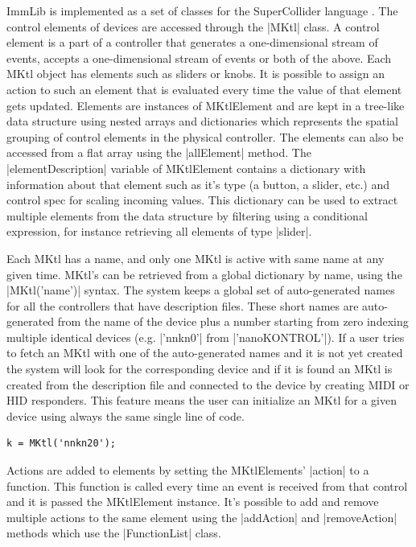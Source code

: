 \documentclass{article}
\begin{document}
ImmLib is implemented as a set of classes for the SuperCollider language \cite{mccartney_ret}. The control elements of devices are accessed through the |MKtl| class. A control element is a part of a controller that generates a one-dimensional stream of events, accepts a one-dimensional stream of events or both of the above. Each MKtl object has elements such as sliders or knobs. It is possible to assign an action to such an element that is evaluated every time the value of that element gets updated. Elements are instances of MKtlElement and are kept in a tree-like data structure using nested arrays and dictionaries which represents the spatial grouping of control elements in the physical controller. The elements can also be accessed from a flat array using the |allElement| method. The |elementDescription| variable of MKtlElement contains a dictionary with information about that element such as it's type (a button, a slider, etc.) and control spec for scaling incoming values. This dictionary can be used to extract multiple elements from the data structure by filtering using a conditional expression, for instance retrieving all elements of type |slider|.

Each MKtl has a name, and only one MKtl is active with same name at any given time. MKtl's can be retrieved from a global dictionary by name, using the |MKtl('name')| syntax. The system keeps a global set of auto-generated names for all the controllers that have description files. These short names are auto-generated from the name of the device plus a number starting from zero indexing multiple identical devices (e.g. |'nnkn0'| from |'nanoKONTROL'|). If a user tries to fetch an MKtl with one of the auto-generated names and it is not yet created the system will look for the corresponding device and if it is found an MKtl is created from the description file and connected to the device by creating MIDI or HID responders. This feature means the user can initialize an MKtl for a given device using always the same single line of code.

\begin{Verbatim}
k = MKtl('nnkn20');
\end{Verbatim}

Actions are added to elements by setting the MKtlElements' |action| to a function. This function is called every time an event is received from that control and it is passed the MKtlElement instance. It's possible to add and remove multiple actions to the same element using the |addAction| and |removeAction| methods which use the |FunctionList| class.
\end{document}
